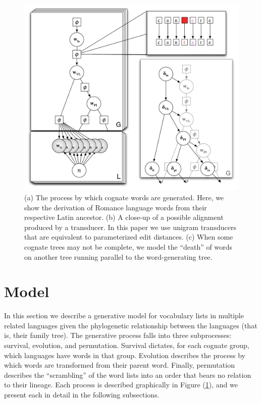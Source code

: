 \documentclass[11pt,a4paper]{article}
\begin{document}
\begin{figure}
  \centering
  \includegraphics[scale=0.4]{gmodel}
  \caption{(a) The process by which cognate words are generated.
  Here, we show the derivation of Romance language words from their
  respective Latin ancestor. (b) A close-up of a possible alignment
  produced by a transducer. In this paper we use unigram transducers
  that are equivalent to parameterized edit distances. (c) When
  some cognate trees may not be complete, we model the ``death''
  of words on another tree running parallel to the word-generating
  tree.}

  \label{fig:gmodel}
\end{figure}

\section{Model}

In this section we describe a generative model for vocabulary lists
in multiple related languages given the phylogenetic relationship
between the languages (that is, their family tree). The generative
process falls into three subprocesses: survival, evolution, and
permutation. Survival dictates, for each cognate group, which
languages have words in that group. Evolution describes the process
by which words are transformed from their parent word. Finally,
permutation describes the ``scrambling'' of the word lists into an
order that bears no relation to their lineage. Each process is
described graphically in Figure (\ref{fig:gmodel}), and we present
each in detail in the following subsections.
\end{document}
